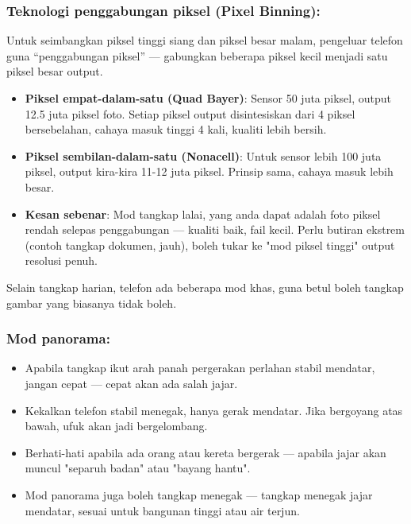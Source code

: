 \subsubsection*{Teknologi penggabungan piksel (Pixel Binning):}

Untuk seimbangkan piksel tinggi siang dan piksel besar malam, pengeluar telefon guna “penggabungan piksel” — gabungkan beberapa piksel kecil menjadi satu piksel besar output.

\begin{itemize}
  \item \textbf{Piksel empat-dalam-satu (Quad Bayer)}: Sensor 50 juta piksel, output 12.5 juta piksel foto. Setiap piksel output disintesiskan dari 4 piksel bersebelahan, cahaya masuk tinggi 4 kali, kualiti lebih bersih.
  \item \textbf{Piksel sembilan-dalam-satu (Nonacell)}: Untuk sensor lebih 100 juta piksel, output kira-kira 11-12 juta piksel. Prinsip sama, cahaya masuk lebih besar.
  \item \textbf{Kesan sebenar}: Mod tangkap lalai, yang anda dapat adalah foto piksel rendah selepas penggabungan — kualiti baik, fail kecil. Perlu butiran ekstrem (contoh tangkap dokumen, jauh), boleh tukar ke "mod piksel tinggi" output resolusi penuh.
\end{itemize}


Selain tangkap harian, telefon ada beberapa mod khas, guna betul boleh tangkap gambar yang biasanya tidak boleh.

\subsubsection*{Mod panorama:}

\begin{itemize}
  \item Apabila tangkap ikut arah panah pergerakan perlahan stabil mendatar, jangan cepat — cepat akan ada salah jajar.
  \item Kekalkan telefon stabil menegak, hanya gerak mendatar. Jika bergoyang atas bawah, ufuk akan jadi bergelombang.
  \item Berhati-hati apabila ada orang atau kereta bergerak — apabila jajar akan muncul "separuh badan" atau "bayang hantu".
  \item Mod panorama juga boleh tangkap menegak — tangkap menegak jajar mendatar, sesuai untuk bangunan tinggi atau air terjun.
\end{itemize}

